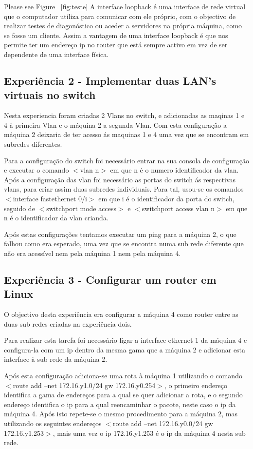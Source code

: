 \documentclass[a4paper]{article}
\begin{document}
\pagebreak

Please see Figure ~\autoref{fig:teste}
A interface loopback é uma interface de rede virtual que o computador utiliza para comunicar com ele próprio, com o objectivo de realizar testes de diagonóstico ou aceder a servidores na própria máquina, como se fosse um cliente. Assim a vantagem de uma interface loopback é que nos permite ter um endereço ip no router que está sempre activo em vez de ser dependente de uma interface física.

\subsection{Experiência 2 - Implementar duas LAN's virtuais no switch}
Nesta experiencia foram criadas 2 Vlans no switch, e adicionadas as maqinas 1 e 4 à primeira Vlan e o máquina 2 a segunda Vlan. Com esta configuração a máquina 2 deixaria de ter acesso ás maquinas 1 e 4 uma vez que se encontram em subredes diferentes.


Para a configuração do switch foi necessário entrar na  sua consola de configuração e executar o comando $<$vlan n$>$ em que n é o numero identificador da vlan. Após a configuração das vlan foi necessário as portas do switch ás respectivas vlans, para criar assim duas subredes individuais. Para tal, usou-se os comandos $<$interface fastethernet 0/i$>$ em que i é o identificador da porta do switch, seguido de $<$switchport mode access$>$ e $<$switchport access vlan n$>$ em que n é o identificador da vlan crianda.


Após estas configurações tentamos executar um ping para a máquina 2, o que falhou como era esperado, uma vez que se encontra numa sub rede diferente que não era acessível nem pela máquina 1 nem pela máquina 4.

\subsection{Experiência 3 - Configurar um router em Linux}
O objectivo desta experiência era configurar a máquina 4 como router entre as duas sub redes criadas na experiência dois.

Para realizar esta tarefa foi necessário ligar a interface ethernet 1 da máquina 4 e configura-la com um ip dentro da mesma gama que a máquina 2 e adicionar esta interface à sub rede da máquina 2.

Após esta configuração adiciona-se uma rota à máquina 1 utilizando o comando $<$route add –net  172.16.y1.0/24 gw 172.16.y0.254$>$, o primeiro endereço identifica a gama de endereços para a qual se quer adicionar a rota, e o segundo endereço identifica o ip para a qual reencaminhar o pacote, neste caso o ip da máquina 4. Após isto repete-se o mesmo procedimento para a máquina 2, mas utilizando os seguintes endereços $<$route add –net 172.16.y0.0/24 gw 172.16.y1.253$>$, mais uma vez o ip 172.16.y1.253 é o ip da máquina 4 nesta sub rede.
\end{document}
